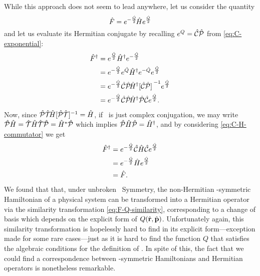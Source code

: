             While this approach does not seem to lead anywhere, let us consider the quantity
            \begin{equation}
                \label{eq:F-Q-similarity}
                \hat{F} = e^{-\frac{\hat{Q}}{2}}\!\hat{H}e^{\frac{\hat{Q}}{2}}
            \end{equation}
            and let us evaluate its Hermitian conjugate by recalling $e^{Q} = \mathcal{\hat{C}}\mathcal{\hat{P}}$ from \eqref{eq:C-exponential}:
            \begin{align*}
                \hF^\dag
                &= \myexp{\frac{\hQ}{2}} \hH^\dag \myexp{-\frac{\hQ}{2}} \\
                &= \myexp{-\frac{\hQ}{2}} \myexp{\hQ} \hH^\dag \myexp{-\hQ} \myexp{\frac{\hQ}{2}} \\
                &= \myexp{-\frac{\hQ}{2}} \hC\hP\! \hH^\dag \bqty*{\hC\hP}^{-1} \myexp{\frac{\hQ}{2}} \\
                &= \myexp{-\frac{\hQ}{2}} \hC\hP\! \hH^\dag \hP\hC \myexp{\frac{\hQ}{2}}
                \myperiod
            \end{align*}
            Now, since $\PTtransform{\hH} = \hH$, if \hT\ is just complex conjugation, we may write $\mathcal{\hat{P}}\hat{H} = \mathcal{\hat{T}}\hat{H}\mathcal{\hat{T}}\mathcal{\hat{P}} = \hat{H}^*\mathcal{\hat{P}}$ which implies $\mathcal{\hat{P}}\hat{H}\mathcal{\hat{P}} = \hat{H}^\dag$, and by considering \eqref{eq:C-H-commutator} we get \cite{bender2024}
            \begin{align*}
                \hat{F}^\dag 
                &= e^{-\frac{\hat{Q}}{2}} \mathcal{\hat{C}} \hat{H} \mathcal{\hat{C}} e^{\frac{\hat{Q}}{2}} \\
                &= e^{-\frac{\hat{Q}}{2}} \hat{H} e^{\frac{\hat{Q}}{2}} \\
                &= \hat{F}
                \text{.}
            \end{align*}
            We found that that, under unbroken \PT\ Symmetry, the non-Hermitian \PT-symmetric Hamiltonian of a physical system can be transformed into a Hermitian operator via the similarity transformation \eqref{eq:F-Q-similarity}, corresponding to a change of basis which depends on the explicit form of $Q\pqty{\hvr,\hvp}$. Unfortunately again, this similarity transformation is hopelessly hard to find in its explicit form---exception made for some rare cases---just as it is hard to find the function $Q$ that satisfies the algebraic conditions for the definition of \hC \cite{bender2024}. In spite of this, the fact that we could find a correspondence between \PT-symmetric Hamiltonians and Hermitian operators is nonetheless remarkable.
            
